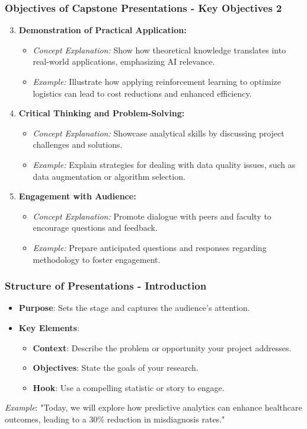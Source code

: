 \documentclass[aspectratio=169]{beamer}
\begin{document}
\begin{frame}[fragile]
    \frametitle{Objectives of Capstone Presentations - Key Objectives 2}
    \begin{enumerate}
        \setcounter{enumi}{2}
        \item \textbf{Demonstration of Practical Application:}
        \begin{itemize}
            \item \textit{Concept Explanation:} Show how theoretical knowledge translates into real-world applications, emphasizing AI relevance.
            \item \textit{Example:} Illustrate how applying reinforcement learning to optimize logistics can lead to cost reductions and enhanced efficiency.
        \end{itemize}

        \item \textbf{Critical Thinking and Problem-Solving:}
        \begin{itemize}
            \item \textit{Concept Explanation:} Showcase analytical skills by discussing project challenges and solutions.
            \item \textit{Example:} Explain strategies for dealing with data quality issues, such as data augmentation or algorithm selection.
        \end{itemize}

        \item \textbf{Engagement with Audience:}
        \begin{itemize}
            \item \textit{Concept Explanation:} Promote dialogue with peers and faculty to encourage questions and feedback.
            \item \textit{Example:} Prepare anticipated questions and responses regarding methodology to foster engagement.
        \end{itemize}
    \end{enumerate}
\end{frame}

\begin{frame}[fragile]
    \frametitle{Structure of Presentations - Introduction}
    \begin{itemize}
        \item \textbf{Purpose}: Sets the stage and captures the audience's attention.
        \item \textbf{Key Elements}:
        \begin{itemize}
            \item \textbf{Context}: Describe the problem or opportunity your project addresses.
            \item \textbf{Objectives}: State the goals of your research.
            \item \textbf{Hook}: Use a compelling statistic or story to engage.
        \end{itemize}
    \end{itemize}
    \textit{Example}: "Today, we will explore how predictive analytics can enhance healthcare outcomes, leading to a 30\% reduction in misdiagnosis rates."
\end{frame}
\end{document}
